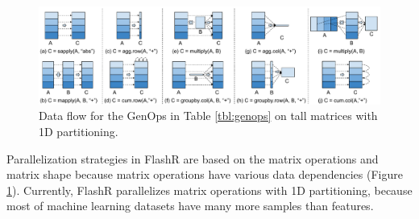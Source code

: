 \begin{figure}
	\centering
	\includegraphics[scale=0.5]{FlashMatrix_figs/Parallelize.pdf}
	\vspace{-4pt}
	\caption{Data flow for the GenOps in Table \ref{tbl:genops} on tall matrices
	 with 1D partitioning.}
	\label{fig:parallel}
  \vspace{-8pt}
\end{figure}

Parallelization strategies in FlashR are based on the matrix operations
and matrix shape because matrix operations have various data dependencies
(Figure \ref{fig:parallel}). Currently, FlashR parallelizes matrix operations
with 1D partitioning, because most of machine learning datasets have many more
samples than features.

